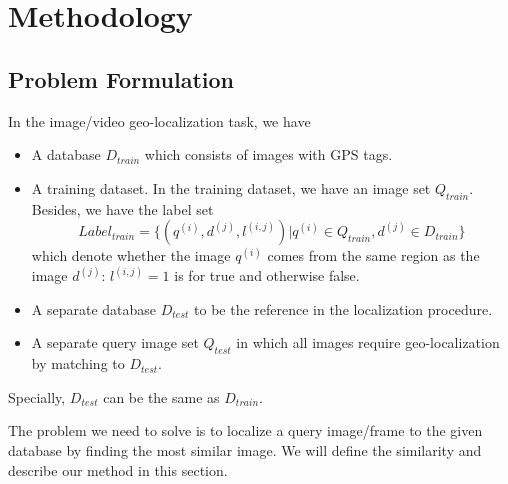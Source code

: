 \section{Methodology}
\par
\subsection{Problem Formulation}
\par
In the image/video geo-localization task, we have 
\begin{itemize}
\item A database $D_{train}$ which consists of images with GPS tags.
\item A training dataset. In the training dataset, we have an image set $Q_{train}$. Besides, we have the label set
$$Label_{train} = \{(q^{(i)}, d^{(j)}, l^{(i, j)}) | q^{(i)}\in Q_{train}, d^{(j)}\in D_{train}\}$$
which denote whether the image $q^{(i)}$ comes from the same region as the image $d^{(j)}$: $l^{(i, j)} = 1$ is for true and otherwise false. 
\item A separate database $D_{test}$ to be the reference in the localization procedure.
\item A separate query image set $Q_{test}$ in which all images require geo-localization by matching to $D_{test}$. 
\end{itemize}
Specially, $D_{test}$ can be the same as $D_{train}$.
\par
The problem we need to solve is to localize a query image/frame to the given database by finding the most similar image. We will define the similarity and describe our method in this section.  \\

